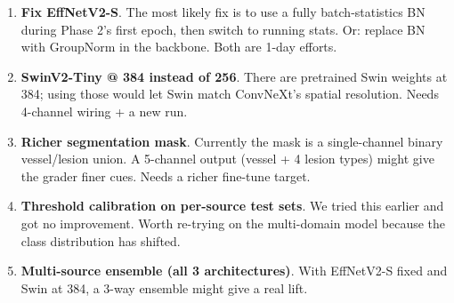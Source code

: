 \documentclass[11pt,a4paper]{article}
\begin{document}
\begin{enumerate}
  \item \textbf{Fix EffNetV2-S}. The most likely fix is to use a fully batch-statistics BN during Phase 2's first epoch, then switch to running stats. Or: replace BN with GroupNorm in the backbone. Both are 1-day efforts.

  \item \textbf{SwinV2-Tiny @ 384 instead of 256}. There are pretrained Swin weights at 384; using those would let Swin match ConvNeXt's spatial resolution. Needs 4-channel wiring + a new run.

  \item \textbf{Richer segmentation mask}. Currently the mask is a single-channel binary vessel/lesion union. A 5-channel output (vessel + 4 lesion types) might give the grader finer cues. Needs a richer fine-tune target.

  \item \textbf{Threshold calibration on per-source test sets}. We tried this earlier and got no improvement. Worth re-trying on the multi-domain model because the class distribution has shifted.

  \item \textbf{Multi-source ensemble (all 3 architectures)}. With EffNetV2-S fixed and Swin at 384, a 3-way ensemble might give a real lift.
\end{enumerate}
\end{document}
